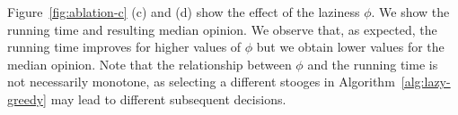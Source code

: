 Figure~\ref{fig:ablation-c} (c)
and (d) show the effect of the laziness
$\phi$.
We show the running time and resulting
median opinion.
We observe that, as expected, the
running time improves for higher
values of $\phi$ but we obtain
lower values for the median opinion.
Note that the relationship between
$\phi$ and the running time is not
necessarily monotone, as selecting
a different stooges in
Algorithm~\ref{alg:lazy-greedy}
may lead to different subsequent
decisions.


\iffalse
\begin{figure}
    \texttt{[image: plots-tmp/plot\_last\_m\_f.pdf]}
    \texttt{[image: plots-tmp/plot\_last\_m.pdf]}
    \figsp
    \caption{Different results for variations of the laziness parameter on a grid graph.}
    \label{fig:ablation-laziness}
\end{figure}
\fi


 
